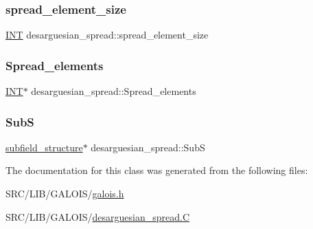 \mbox{\label{classdesarguesian__spread_a745b723f444092072d55c5263973a583}} 
\subsubsection{\texorpdfstring{spread\+\_\+element\+\_\+size}{spread\_element\_size}}
{\footnotesize\ttfamily \mbox{\hyperlink{galois_8h_a09fddde158a3a20bd2dcadb609de11dc}{I\+NT}} desarguesian\+\_\+spread\+::spread\+\_\+element\+\_\+size}

\mbox{\label{classdesarguesian__spread_a1a5d103df69f5a03c376ba45792db59f}} 
\subsubsection{\texorpdfstring{Spread\+\_\+elements}{Spread\_elements}}
{\footnotesize\ttfamily \mbox{\hyperlink{galois_8h_a09fddde158a3a20bd2dcadb609de11dc}{I\+NT}}$\ast$ desarguesian\+\_\+spread\+::\+Spread\+\_\+elements}

\mbox{\label{classdesarguesian__spread_a37ff42bc23a84c3134679820f6956cae}} 
\subsubsection{\texorpdfstring{SubS}{SubS}}
{\footnotesize\ttfamily \mbox{\hyperlink{classsubfield__structure}{subfield\+\_\+structure}}$\ast$ desarguesian\+\_\+spread\+::\+SubS}



The documentation for this class was generated from the following files\+:\begin{DoxyCompactItemize}
\item 
S\+R\+C/\+L\+I\+B/\+G\+A\+L\+O\+I\+S/\mbox{\hyperlink{galois_8h}{galois.\+h}}\item 
S\+R\+C/\+L\+I\+B/\+G\+A\+L\+O\+I\+S/\mbox{\hyperlink{_l_i_b_2_g_a_l_o_i_s_2desarguesian__spread_8_c}{desarguesian\+\_\+spread.\+C}}\end{DoxyCompactItemize}
